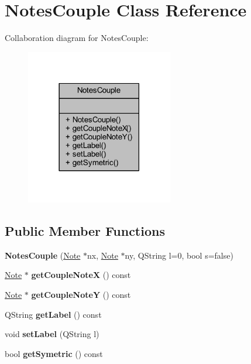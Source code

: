 \hypertarget{class_notes_couple}{}\section{Notes\+Couple Class Reference}
\label{class_notes_couple}


Collaboration diagram for Notes\+Couple\+:
\nopagebreak
\begin{figure}[H]
\begin{center}
\leavevmode
\includegraphics[width=182pt]{class_notes_couple__coll__graph}
\end{center}
\end{figure}
\subsection*{Public Member Functions}
\begin{DoxyCompactItemize}
\item 
\mbox{\label{class_notes_couple_ac9bb6dd9ba7376af7030f3b64a24ae88}} 
{\bfseries Notes\+Couple} (\hyperlink{class_note}{Note} $\ast$nx, \hyperlink{class_note}{Note} $\ast$ny, Q\+String l=0, bool s=false)
\item 
\mbox{\label{class_notes_couple_a1769af8ac96f94717f9b59011ee3cab1}} 
\hyperlink{class_note}{Note} $\ast$ {\bfseries get\+Couple\+NoteX} () const
\item 
\mbox{\label{class_notes_couple_ab56dc53d43664f370a8d2af58c9d4b90}} 
\hyperlink{class_note}{Note} $\ast$ {\bfseries get\+Couple\+NoteY} () const
\item 
\mbox{\label{class_notes_couple_ac163d6cd5d3f17f7b74ec353e8feffb9}} 
Q\+String {\bfseries get\+Label} () const
\item 
\mbox{\label{class_notes_couple_a12fd471a0510e598869592460377258f}} 
void {\bfseries set\+Label} (Q\+String l)
\item 
\mbox{\label{class_notes_couple_addb870bdbfdd5586f214c908122e597d}} 
bool {\bfseries get\+Symetric} () const
\end{DoxyCompactItemize}


